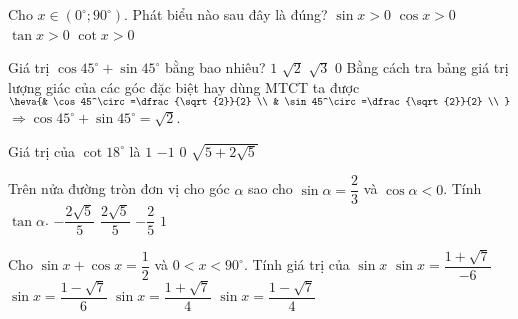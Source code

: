\begin{ex}
	Cho $x\in\left(0^\circ;90^\circ\right)$. Phát biểu nào sau đây là đúng?
	\choice
	{\True $\sin x>0$}
	{$\cos x>0$}
	{$\tan x>0$}
	{$\cot x>0$}
\end{ex}
\begin{ex}
	Giá trị $\cos 45^\circ+\sin 45^\circ$ bằng bao nhiêu?
	\choice
	{$1$}
	{\True $\sqrt{2}$}
	{$\sqrt{3}$}
	{$0$}
	\loigiai
	{Bằng cách tra bảng giá trị lượng giác của các góc đặc biệt hay dùng MTCT ta được $\heva{& \cos 45^\circ=\dfrac{\sqrt{2}}{2} \\ 
			& \sin 45^\circ=\dfrac{\sqrt{2}}{2} \\ 
		}$\\
		$\Rightarrow \cos 45^\circ+\sin 45^\circ=\sqrt{2}$.}
\end{ex}
\begin{ex}
	Giá trị của $\cot18^\circ$ là
	\choice
	{$1$}
	{$-1$}
	{$0$}
	{\True $\sqrt{5+2\sqrt{5}}$}
\end{ex}
\begin{ex}
	Trên nửa đường tròn đơn vị cho góc $\alpha$ sao cho $\sin\alpha=\dfrac{2}{3}$ và $\cos\alpha<0$. Tính $\tan\alpha$.
	\choice
	{\True $-\dfrac{2\sqrt{5}}{5}$}
	{$\dfrac{2\sqrt{5}}{5}$}
	{$-\dfrac{2}{5}$}
	{$1$}
\end{ex}
\begin{ex}
	Cho $\sin x+\cos x=\dfrac{1}{2}$ và $0<x<90^\circ$. Tính giá trị của $\sin x$
	\choice
	{$\sin x=\dfrac{1+\sqrt{7}}{-6}$}
	{$\sin x=\dfrac{1-\sqrt{7}}{6}$}
	{\True $\sin x=\dfrac{1+\sqrt{7}}{4}$}
	{$\sin x=\dfrac{1-\sqrt{7}}{4}$}
\end{ex}  
